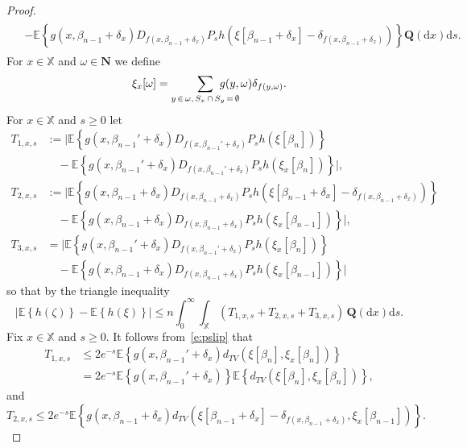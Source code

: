 \documentclass[10pt]{amsart}
\theoremstyle{definition}\newtheorem{defi}[theo]{Definition}\newtheorem{rema}[theo]{Remark}\newtheorem{exam}[theo]{Example}\newtheorem{exem}[theo]{Example}\newtheorem{nota}[theo]{Notation}
\newcommand*\bN{\mathbf{N}}
\newcommand{\bQ}{\mathbf{Q}}
\newcommand*\X{\mathbb{X}}
\newcommand{\E}{\mathbb{E}}
\newcommand*\md{\mathrm{d}}
\newcommand{\mean}[1] {\E\left\{{#1}\right\}}
\begin{document}
\begin{proof}
\begin{multline*}
\begin{aligned}
& - \mean{g\left(x,\beta_{n-1}+\delta_x\right) D_{f\left(x,\beta_{n-1}+\delta_x\right)}P_sh\left(\xi\left[\beta_{n-1}+\delta_x\right]-\delta_{f\left(x,\beta_{n-1}+\delta_x\right)}\right)} \bQ(\md x) \md s.
\end{aligned}
\end{multline*}
For $x\in\X$ and $\omega\in\bN$ we define
\[
\xi_{x}[\omega]= \sum_{y\,\in\,\omega,\,S_x\,\cap \,S_y\,=\,\emptyset}\mkern-35mu g(y,\omega) \delta_{f(y,\omega)}.
\]
For $x\in\X$ and $s\geq 0$ let
\begin{align*}
T_{1,x,s} & := \big| \mean{g\left(x,\beta_{n-1}'+\delta_x\right) D_{f\left(x,\beta_{n-1}'+\delta_x\right)}P_sh\left(\xi\left[\beta_n\right]\right) } \\
& \quad - \mean{g\left(x,\beta_{n-1}'+\delta_x\right) D_{f\left(x,\beta_{n-1}'+\delta_x\right)}P_sh\left(\xi_x\left[\beta_{n}\right]\right)} \big|, \\
T_{2,x,s} & := \big|\mean{g\left(x,\beta_{n-1}+\delta_x\right) D_{f\left(x,\beta_{n-1}+\delta_x\right)}P_sh\left(\xi\left[\beta_{n-1}+\delta_x\right] -\delta_{f\left(x,\beta_{n-1}+\delta_x\right)}\right) } \\
& \quad - \mean{g\left(x,\beta_{n-1}+\delta_x\right) D_{f\left(x,\beta_{n-1}+\delta_x\right)}P_sh\left(\xi_x\left[\beta_{n-1}\right]\right) } \big|, \\
T_{3,x,s} & = \big| \mean{g\left(x,\beta_{n-1}'+\delta_x\right) D_{f\left(x,\beta_{n-1}'+\delta_x\right)}P_sh\left(\xi_x\left[\beta_{n}\right]\right) } \\
& \quad- \mean{g\left(x,\beta_{n-1}+\delta_x\right) D_{f\left(x,\beta_{n-1}+\delta_x\right)}P_sh\left(\xi_x\left[\beta_{n-1}\right]\right)} \big|
\end{align*}
so that by the triangle inequality
\begin{equation}\label{e:InequalityTs}
\big| \mean{h(\zeta)} - \mean{h(\xi)} \big| \leq n \int_0^\infty \int_{\X} \left(T_{1,x,s} + T_{2,x,s} + T_{3,x,s} \right) \, \bQ(\md x) \md s.
\end{equation}
Fix $x\in\X$ and $s\geq 0$. It follows from~\eqref{e:pslip} that
\begin{align*}
T_{1,x,s} & \leq 2e^{-s} \mean{ g\left(x,\beta_{n-1}'+\delta_x\right) d_{TV}\left(\xi[\beta_n],\xi_x[\beta_{n}]\right) } \\
& = 2e^{-s} \mean{ g\left(x,\beta_{n-1}'+\delta_x\right)} \mean{d_{TV}\left(\xi[\beta_n],\xi_x[\beta_{n}]\right) },
\end{align*}
and
\[
T_{2,x,s} \leq 2e^{-s} \mean{ g\left(x,\beta_{n-1}+\delta_x\right) d_{TV}\left(\xi\left[\beta_{n-1}+\delta_x\right] -\delta_{f\left(x,\beta_{n-1}+\delta_x\right)},\xi_x\left[\beta_{n-1}\right]\right)}.
\]
\end{proof}
\end{document}
